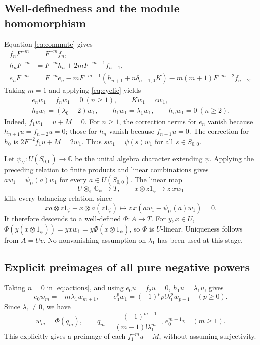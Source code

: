 \documentclass[11pt]{article}
\newcommand{\C}{\mathbb C}
\begin{document}
\subsection{Well-definedness and the module homomorphism}

Equation \eqref{eq:commute} gives
\begin{equation}\label{eq:actions}
\begin{aligned}
 f_nF^{-m}&=F^{-m}f_n,\\
 h_nF^{-m}&=F^{-m}h_n+2mF^{-m-1}f_{n+1},\\
 e_nF^{-m}&=F^{-m}e_n
  -mF^{-m-1}(h_{n+1}+n\delta_{n+1,0}K)
  -m(m+1)F^{-m-2}f_{n+2}.
\end{aligned}
\end{equation}
Taking \(m=1\) and applying \eqref{eq:cyclic} yields
\[
\begin{gathered}
 e_nw_1=f_nw_1=0\ (n\ge1),\qquad Kw_1=cw_1,\\
 h_0w_1=(\lambda_0+2)w_1,\qquad h_1w_1=\lambda_1w_1,\qquad
 h_nw_1=0\ (n\ge2).
\end{gathered}
\]
Indeed, \(f_1w_1=u+M=0\). For \(n\ge1\), the correction terms for \(e_n\)
vanish because \(h_{n+1}u=f_{n+2}u=0\); those for \(h_n\) vanish because
\(f_{n+1}u=0\). The correction for \(h_0\) is
\(2F^{-2}f_1u+M=2w_1\).
Thus \(sw_1=\psi(s)w_1\) for all \(s\in S_{0,0}\).

Let \(\psi_U:U(S_{0,0})\to\C\) be the unital algebra character extending
\(\psi\). Applying the preceding relation to finite products and linear
combinations gives \(aw_1=\psi_U(a)w_1\) for every \(a\in U(S_{0,0})\).
The linear map
\[
 U\otimes_\C\C_\psi\longrightarrow T,\qquad
 x\otimes z1_\psi\longmapsto z\,xw_1
\]
kills every balancing relation, since
\[
 xa\otimes z1_\psi-x\otimes a(z1_\psi)
 \longmapsto z\,x(aw_1-\psi_U(a)w_1)=0.
\]
It therefore descends to a well-defined \(\Phi:A\to T\).
For \(y,x\in U\),
\(\Phi(y(x\otimes1_\psi))=yxw_1=y\Phi(x\otimes1_\psi)\),
so \(\Phi\) is \(U\)-linear. Uniqueness follows from \(A=Uv\).
No nonvanishing assumption on \(\lambda_1\) has been used at this stage.

\subsection{Explicit preimages of all pure negative powers}

Taking \(n=0\) in \eqref{eq:actions}, and using
\(e_0u=f_2u=0\), \(h_1u=\lambda_1u\), gives
\begin{equation}\label{eq:tower}
 e_0w_m=-m\lambda_1w_{m+1},\qquad
 e_0^pw_1=(-1)^pp!\lambda_1^pw_{p+1}\quad(p\ge0).
\end{equation}
Since \(\lambda_1\ne0\), we have
\begin{equation}\label{eq:preimage}
 w_m=\Phi(q_m),\qquad
 q_m=\frac{(-1)^{m-1}}{(m-1)!\lambda_1^{m-1}}e_0^{m-1}v\quad(m\ge1).
\end{equation}
This explicitly gives a preimage of each \(f_1^{-m}u+M\), without assuming
surjectivity.
\end{document}
